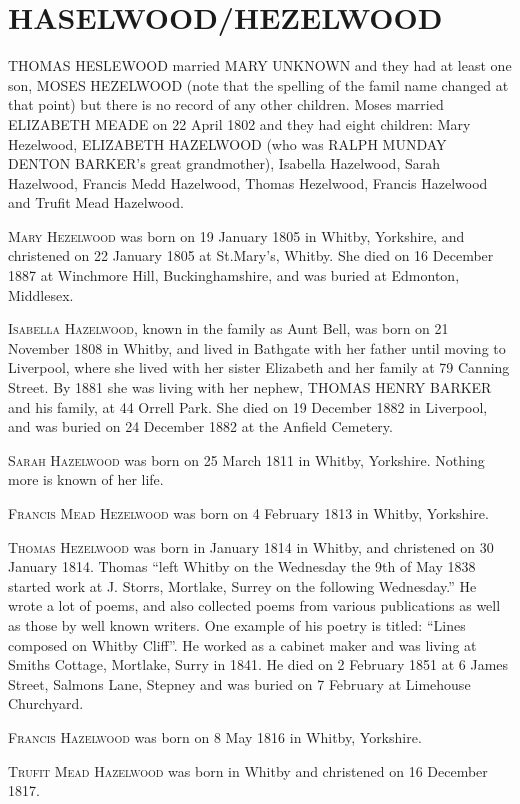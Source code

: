 \section{HASELWOOD/HEZELWOOD}

\uppercase{Thomas Heslewood} married \uppercase{Mary Unknown} and they had at least one son, \uppercase{Moses Hezelwood} (note that the spelling of the famil name changed at that point) but there is no record of any other children.  Moses married \uppercase{Elizabeth Meade} on 22 April 1802 and they had eight children: Mary Hezelwood, \uppercase{Elizabeth Hazelwood} (who was \uppercase{Ralph Munday Denton Barker}'s great grandmother), Isabella Hazelwood, Sarah Hazelwood, Francis Medd Hazelwood, Thomas Hezelwood, Francis Hazelwood and Trufit Mead Hazelwood. 

\textsc{Mary Hezelwood} was born on 19 January 1805 in Whitby, Yorkshire, and christened on 22 January 1805 at St.Mary's,	Whitby. She died on 16 December 1887 at Winchmore Hill, Buckinghamshire, and was buried at Edmonton, Middlesex.

\textsc{Isabella Hazelwood}, known in the family as Aunt Bell, was born on 21 November 1808 in Whitby, and lived in Bathgate with her father until moving to Liverpool, where she lived with her sister Elizabeth and her family at 79 Canning Street. By 1881 she was living with her nephew, \uppercase{Thomas Henry Barker} and his family, at 44 Orrell Park.  She died on 19 December 1882 in Liverpool, and was buried on 24 December 1882 at the Anfield Cemetery. 	

\textsc{Sarah Hazelwood} was born on 25 March 1811 in	Whitby, Yorkshire. Nothing more is known of her life.

\textsc{Francis Mead Hezelwood} was born on 4 February 1813 in Whitby, Yorkshire.

\textsc{Thomas Hezelwood} was born in January 1814 in	Whitby, and christened on 30 January 1814.  Thomas ``left Whitby on the Wednesday the 9th of May 1838 started work at J. Storrs, Mortlake, Surrey on the following Wednesday.'' He wrote a lot of poems, and also collected poems from various publications as well as those by well known writers. One example of his poetry is titled: ``Lines composed on Whitby Cliff''.  He worked as a cabinet maker and was living at Smiths Cottage, Mortlake, Surry in 1841. He died on 2 February 1851 at 6 James Street, Salmons Lane, Stepney and was buried on 7 February at Limehouse Churchyard.

\textsc{Francis Hazelwood} was born on 8 May 1816 in Whitby, Yorkshire.

\textsc{Trufit Mead Hazelwood} was born in Whitby and christened on 16 December 1817.


